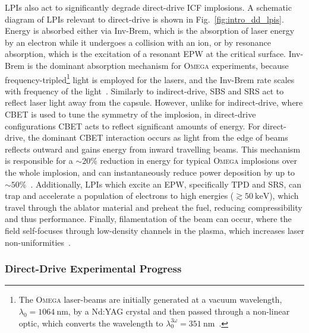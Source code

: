 \ac{LPIs} also act to significantly degrade direct-drive \ac{ICF} implosions.
A schematic diagram of \ac{LPIs} relevant to direct-drive is shown in Fig.~\ref{fig:intro_dd_lpis}.
Energy is absorbed either via \ac{Inv-Brem}, which is the absorption of laser energy by an electron while it undergoes a collision with an ion, or by resonance absorption, which is the excitation of a resonant \ac{EPW} at the critical surface.
\ac{Inv-Brem} is the dominant absorption mechanism for \textsc{Omega} experiments, because frequency-tripled\footnote{The \textsc{Omega} laser-beams are initially generated at a vacuum wavelength, $\lambda_0 = 1064\ \text{nm}$, by a Nd:YAG crystal and then passed through a non-linear optic, which converts the wavelength to $\lambda_0^{3\omega}=351\ \text{nm}$~\cite{boehly_upgrade_1995}.} light is employed for the lasers, and the \ac{Inv-Brem} rate scales with frequency of the light~\cite{huba_nrl_2013}.
Similarly to indirect-drive, \ac{SBS} and \ac{SRS} act to reflect laser light away from the capsule.
However, unlike for indirect-drive, where \ac{CBET} is used to tune the symmetry of the implosion, in direct-drive configurations \ac{CBET} acts to reflect significant amounts of energy.
For direct-drive, the dominant \ac{CBET} interaction occurs as light from the edge of beams reflects outward and gains energy from inward travelling beams.
This mechanism is responsible for a $\sim20\%$ reduction in energy for typical \textsc{Omega} implosions over the whole implosion, and can instantaneously reduce power deposition by up to $\sim50\%$~\cite{colaitis_inverse_2021}.
Additionally, \ac{LPIs} which excite an \ac{EPW}, specifically \ac{TPD} and \ac{SRS}, can trap and accelerate a population of electrons to high energies ($\gtrsim50\ \text{keV}$), which travel through the ablator material and preheat the fuel, reducing compressibility and thus performance.
Finally, filamentation of the beam can occur, where the field self-focuses through low-density channels in the plasma, which increases laser non-uniformities~\cite{afshar-rad_evidence_1992}.

\subsubsection{Direct-Drive Experimental Progress}%
\label{sec:intro_direct_exp}

